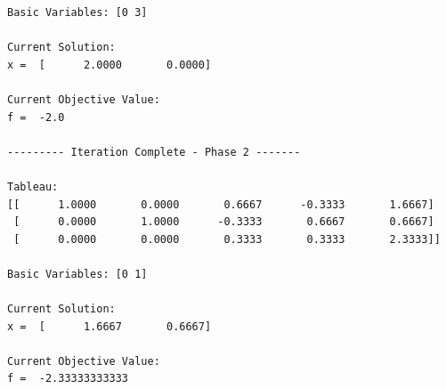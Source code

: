 \begin{verbatim}
Basic Variables: [0 3]

Current Solution:
x =  [      2.0000       0.0000]

Current Objective Value:
f =  -2.0

--------- Iteration Complete - Phase 2 -------

Tableau:
[[      1.0000       0.0000       0.6667      -0.3333       1.6667]
 [      0.0000       1.0000      -0.3333       0.6667       0.6667]
 [      0.0000       0.0000       0.3333       0.3333       2.3333]]

Basic Variables: [0 1]

Current Solution:
x =  [      1.6667       0.6667]

Current Objective Value:
f =  -2.33333333333

\end{verbatim}
